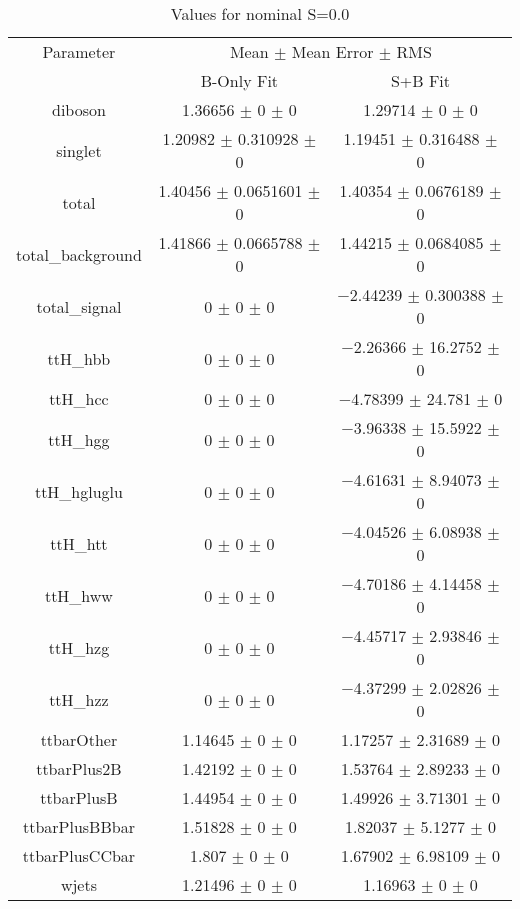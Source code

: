 \begin{table}
\centering
\caption{Values for nominal S=0.0}
\begin{tabular}{ccc}
\toprule
Parameter & \multicolumn{2}{c}{Mean $\pm$ Mean Error $\pm$ RMS}\\
 & B-Only Fit & S+B Fit\\
\midrule
diboson & \num{1.36656} $\pm$ \num{0} $\pm$ \num{0} & \num{1.29714} $\pm$ \num{0} $\pm$ \num{0}\\
singlet & \num{1.20982} $\pm$ \num{0.310928} $\pm$ \num{0} & \num{1.19451} $\pm$ \num{0.316488} $\pm$ \num{0}\\
total & \num{1.40456} $\pm$ \num{0.0651601} $\pm$ \num{0} & \num{1.40354} $\pm$ \num{0.0676189} $\pm$ \num{0}\\
total\_background & \num{1.41866} $\pm$ \num{0.0665788} $\pm$ \num{0} & \num{1.44215} $\pm$ \num{0.0684085} $\pm$ \num{0}\\
total\_signal & \num{0} $\pm$ \num{0} $\pm$ \num{0} & \num{-2.44239} $\pm$ \num{0.300388} $\pm$ \num{0}\\
ttH\_hbb & \num{0} $\pm$ \num{0} $\pm$ \num{0} & \num{-2.26366} $\pm$ \num{16.2752} $\pm$ \num{0}\\
ttH\_hcc & \num{0} $\pm$ \num{0} $\pm$ \num{0} & \num{-4.78399} $\pm$ \num{24.781} $\pm$ \num{0}\\
ttH\_hgg & \num{0} $\pm$ \num{0} $\pm$ \num{0} & \num{-3.96338} $\pm$ \num{15.5922} $\pm$ \num{0}\\
ttH\_hgluglu & \num{0} $\pm$ \num{0} $\pm$ \num{0} & \num{-4.61631} $\pm$ \num{8.94073} $\pm$ \num{0}\\
ttH\_htt & \num{0} $\pm$ \num{0} $\pm$ \num{0} & \num{-4.04526} $\pm$ \num{6.08938} $\pm$ \num{0}\\
ttH\_hww & \num{0} $\pm$ \num{0} $\pm$ \num{0} & \num{-4.70186} $\pm$ \num{4.14458} $\pm$ \num{0}\\
ttH\_hzg & \num{0} $\pm$ \num{0} $\pm$ \num{0} & \num{-4.45717} $\pm$ \num{2.93846} $\pm$ \num{0}\\
ttH\_hzz & \num{0} $\pm$ \num{0} $\pm$ \num{0} & \num{-4.37299} $\pm$ \num{2.02826} $\pm$ \num{0}\\
ttbarOther & \num{1.14645} $\pm$ \num{0} $\pm$ \num{0} & \num{1.17257} $\pm$ \num{2.31689} $\pm$ \num{0}\\
ttbarPlus2B & \num{1.42192} $\pm$ \num{0} $\pm$ \num{0} & \num{1.53764} $\pm$ \num{2.89233} $\pm$ \num{0}\\
ttbarPlusB & \num{1.44954} $\pm$ \num{0} $\pm$ \num{0} & \num{1.49926} $\pm$ \num{3.71301} $\pm$ \num{0}\\
ttbarPlusBBbar & \num{1.51828} $\pm$ \num{0} $\pm$ \num{0} & \num{1.82037} $\pm$ \num{5.1277} $\pm$ \num{0}\\
ttbarPlusCCbar & \num{1.807} $\pm$ \num{0} $\pm$ \num{0} & \num{1.67902} $\pm$ \num{6.98109} $\pm$ \num{0}\\
wjets & \num{1.21496} $\pm$ \num{0} $\pm$ \num{0} & \num{1.16963} $\pm$ \num{0} $\pm$ \num{0}\\
\bottomrule
\end{tabular}
\end{table}